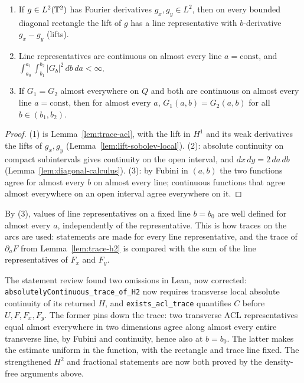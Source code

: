 \begin{lemma}
\label{lem:line-representatives}
\leanok
\begin{enumerate}
  \item If $g\in L^2(\mathbb{T}^2)$ has Fourier derivatives $g_x,g_y\in L^2$, then on every bounded
        diagonal rectangle the lift of $g$ has a line representative with $b$-derivative
        $g_x-g_y$ (lifts).
  \item Line representatives are continuous on almost every line $a=\mathrm{const}$, and
        $\int_{a_0}^{a_1}\int_{b_1}^{b_2}|G_b|^2\,db\,da<\infty$.
  \item If $G_1=G_2$ almost everywhere on $Q$ and both are continuous on almost every line
        $a=\mathrm{const}$, then for almost every $a$, $G_1(a,b)=G_2(a,b)$ for all
        $b\in(b_1,b_2)$.
\end{enumerate}
\end{lemma}

\begin{proof}
\leanok
(1) is Lemma~\ref{lem:trace-acl}, with the lift in $H^1$ and its weak derivatives the lifts
of $g_x,g_y$ (Lemma~\ref{lem:lift-sobolev-local}). (2): absolute continuity on compact
subintervals gives continuity on the open interval, and $dx\,dy=2\,da\,db$
(Lemma~\ref{lem:diagonal-calculus}). (3): by Fubini in $(a,b)$ the two functions agree for
almost every $b$ on almost every line; continuous functions that agree almost everywhere on an
open interval agree everywhere on it.
\end{proof}

\begin{remark}
By (3), values of line representatives on a fixed line $b=b_0$ are well defined for almost
every $a$, independently of the representative. This is how traces on the arcs are used:
statements are made for every line representative, and the trace of $\partial_aF$ from
Lemma~\ref{lem:trace-h2} is compared with the sum of the line representatives of $F_x$ and
$F_y$.

The statement review found two omissions in Lean, now corrected:
\texttt{absolutelyContinuous\_trace\_of\_H2} now requires transverse local absolute
continuity of its returned $H$, and \texttt{exists\_acl\_trace} quantifies $C$ before
$U,F,F_x,F_y$. The former pins down the trace: two transverse ACL representatives
equal almost everywhere in two dimensions agree along almost every entire transverse
line, by Fubini and continuity, hence also at $b=b_0$. The latter makes the estimate
uniform in the function, with the rectangle and trace line fixed. The strengthened
$H^2$ and fractional statements are now both proved by the density-free
arguments above.
\end{remark}

